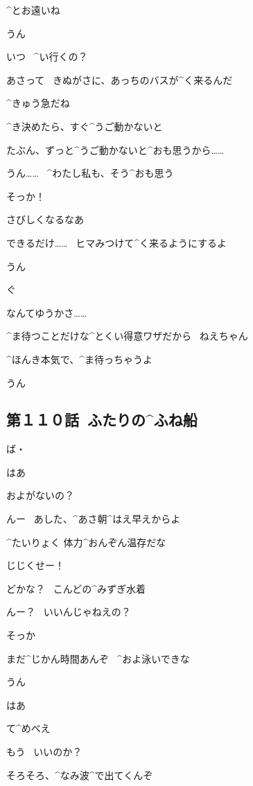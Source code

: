 \Alpha ^{とお}{遠}いね

\Takahiro うん

\page
\Alpha いつ
\ ^{い}{行}くの？

\Takahiro あさって
\ きぬがさに、あっちのバスが^{く}{来}るんだ

\Alpha ^{きゅう}{急}だね

\Takahiro ^{き}{決}めたら、すぐ^{うご}{動}かないと

\Takahiro たぶん、ずっと^{うご}{動}かないと^{おも}{思}うから……

\Alpha うん……
\ ^{わたし}{私}も、そう^{おも}{思}う

\Alpha そっか！

\page
\Alpha さびしくなるなあ

\Takahiro できるだけ……
\ ヒマみつけて^{く}{来}るようにするよ

\Alpha うん

\page
\Takahiro ぐ

\Alpha なんてゆうかさ……

\Alpha ^{ま}{待}つことだけな^{とくい}{得意}ワザだから
\ ねえちゃん

\Alpha ^{ほんき}{本気}で、^{ま}{待}っちゃうよ

\page
\Takahiro うん


\subsection{第１１０話\ ふたりの^{ふね}{船}}

\page[153]
\Makki ば・

\Makki はあ

\Makki およがないの？

\Takahiro んー
\ あした、^{あさ}{朝}^{はえ}{早}えからよ

\Takahiro ^{たいりょく }{体力}^{おんぞん}{温存}だな

\Makki じじくせー！

\page
\Makki どかな？
\ こんどの^{みずぎ}{水着}

\Takahiro んー？
\ いいんじゃねえの？

\Makki そっか

\Takahiro まだ^{じかん}{時間}あんぞ
\ ^{およ}{泳}いできな

\Makki うん

\page
\Makki はあ

\Takahiro て^{め}{べ}え

\page[157]
\Takahiro もう
\ いいのか？

\Takahiro そろそろ、^{なみ}{波}^{で}{出}てくんぞ

